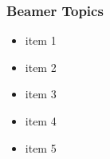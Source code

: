 \documentclass[main.tex]{subfiles}
\begin{document}
    \begin{frame}
    \frametitle{Beamer Topics}

    \begin{itemize}
      \item<1->item 1
      \item<2->item 2
      \item<3->item 3
      \item<4->item 4
      \item<5->item 5
    \end{itemize}

  \end{frame}
\end{document}
